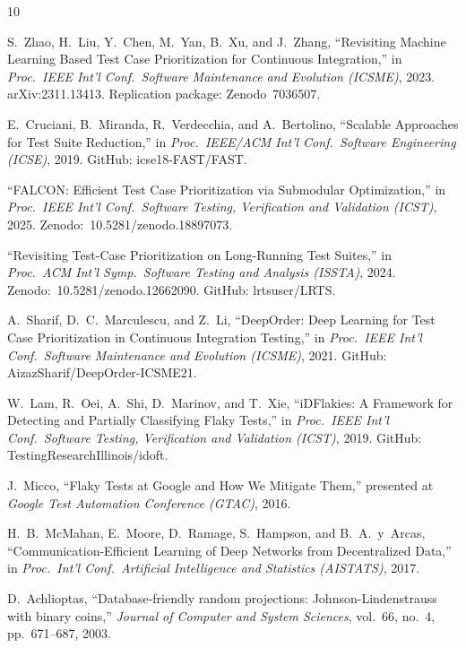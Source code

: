 \documentclass[conference]{IEEEtran}
\begin{document}
\begin{thebibliography}{10}

S.~Zhao, H.~Liu, Y.~Chen, M.~Yan, B.~Xu, and J.~Zhang,
``Revisiting Machine Learning Based Test Case Prioritization for Continuous Integration,'' in \textit{Proc.~IEEE Int'l Conf.~Software Maintenance and Evolution (ICSME)}, 2023. arXiv:2311.13413. Replication package: Zenodo~7036507.

E.~Cruciani, B.~Miranda, R.~Verdecchia, and A.~Bertolino,
``Scalable Approaches for Test Suite Reduction,'' in \textit{Proc.~IEEE/ACM Int'l Conf.~Software Engineering (ICSE)}, 2019. GitHub: icse18-FAST/FAST.

``FALCON: Efficient Test Case Prioritization via Submodular Optimization,'' in \textit{Proc.~IEEE Int'l Conf.~Software Testing, Verification and Validation (ICST)}, 2025. Zenodo:~10.5281/zenodo.18897073.

``Revisiting Test-Case Prioritization on Long-Running Test Suites,'' in \textit{Proc.~ACM Int'l Symp.~Software Testing and Analysis (ISSTA)}, 2024. Zenodo:~10.5281/zenodo.12662090. GitHub: lrtsuser/LRTS.

A.~Sharif, D.~C.~Marculescu, and Z.~Li,
``DeepOrder: Deep Learning for Test Case Prioritization in Continuous Integration Testing,'' in \textit{Proc.~IEEE Int'l Conf.~Software Maintenance and Evolution (ICSME)}, 2021. GitHub: AizazSharif/DeepOrder-ICSME21.

W.~Lam, R.~Oei, A.~Shi, D.~Marinov, and T.~Xie,
``iDFlakies: A Framework for Detecting and Partially Classifying Flaky Tests,'' in \textit{Proc.~IEEE Int'l Conf.~Software Testing, Verification and Validation (ICST)}, 2019. GitHub: TestingResearchIllinois/idoft.

J.~Micco, ``Flaky Tests at Google and How We Mitigate Them,'' presented at \textit{Google Test Automation Conference (GTAC)}, 2016.

H.~B.~McMahan, E.~Moore, D.~Ramage, S.~Hampson, and B.~A.~y~Arcas,
``Communication-Efficient Learning of Deep Networks from Decentralized Data,'' in \textit{Proc.~Int'l Conf.~Artificial Intelligence and Statistics (AISTATS)}, 2017.

D.~Achlioptas,
``Database-friendly random projections: Johnson-Lindenstrauss with binary coins,'' \textit{Journal of Computer and System Sciences}, vol.~66, no.~4, pp.~671--687, 2003.

\end{thebibliography}
\end{document}
